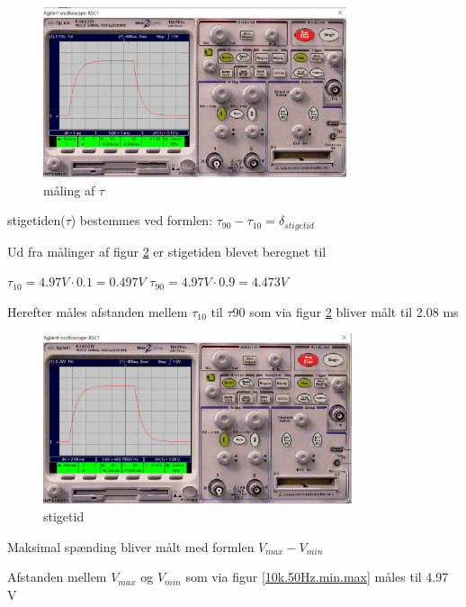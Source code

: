 \begin{figure}[h]
 \begin{center}
  \includegraphics[height=5cm]{P_Fig/figur3_10k_50Hz_tau}
  \caption{måling af $\tau$}
  \label{10k.50Hz.tau}
 \end{center}
\end{figure}









stigetiden($\tau$) bestemmes ved formlen:
$\tau_{90} - \tau_{10} = \delta_{stigetid}$

Ud fra målinger af figur \ref{10k.50Hz.stigetid}
er stigetiden blevet beregnet til

$\tau_{10} = 4.97 V \cdot 0.1 = 0.497 V$
$\tau_{90} = 4.97 V \cdot 0.9 = 4.473 V$

Herefter måles afstanden mellem $\tau_{10}$ til $\tau{90}$ som via figur \ref{10k.50Hz.stigetid} bliver målt til 2.08 ms

\begin{figure}[h]
 \begin{center}
  \includegraphics[height=5cm]{P_Fig/figur4_10k_50Hz_stigetid}
  \caption{stigetid}
  \label{10k.50Hz.stigetid}
 \end{center}
\end{figure}

Maksimal spænding bliver målt med formlen
$V_{max} - V_{min}$

Afstanden mellem $V_{max}$ og $V_{min}$ som via figur \ref{10k.50Hz.min.max} måles til 4.97 V

